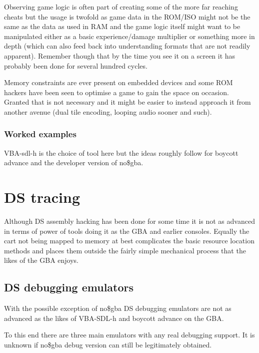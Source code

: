 \documentclass[
]{book}
\begin{document}
Observing game logic is often part of creating some of the more far reaching cheats but the usage is twofold as game data in the ROM/ISO might not be the same as the data as used in RAM and the game logic itself might want to be manipulated either as a basic experience/damage multiplier or something more in depth (which can also feed back into understanding formats that are not readily apparent). Remember though that by the time you see it on a screen it has probably been done for several hundred cycles.

Memory constraints are ever present on embedded devices and some ROM hackers have been seen to optimise a game to gain the space on occasion. Granted that is not necessary and it might be easier to instead approach it from another avenue (dual tile encoding, looping audio sooner and such).

\hypertarget{worked-examples}{%
\subsection{Worked examples}\label{worked-examples}}

VBA-sdl-h is the choice of tool here but the ideas roughly follow for boycott advance and the developer version of no\$gba.

\hypertarget{ds-tracing}{%
\chapter{DS tracing}\label{ds-tracing}}

Although DS assembly hacking has been done for some time it is not as advanced in terms of power of tools doing it as the GBA and earlier consoles. Equally the cart not being mapped to memory at best complicates the basic resource location methods and places them outside the fairly simple mechanical process that the likes of the GBA enjoys.

\hypertarget{ds-debugging-emulators}{%
\section{DS debugging emulators}\label{ds-debugging-emulators}}

With the possible exception of no\$gba DS debugging emulators are not as advanced as the likes of VBA-SDL-h and boycott advance on the GBA.

To this end there are three main emulators with any real debugging support. It is unknown if no\$gba debug version can still be legitimately obtained.
\end{document}
